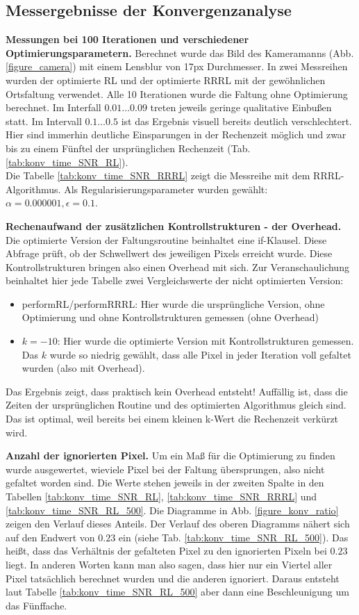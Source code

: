 \documentclass[a4paper,12pt]{article}
\begin{document}
 
\subsection{Messergebnisse der Konvergenzanalyse}

\textbf{Messungen bei 100 Iterationen und verschiedener Optimierungsparametern.}
Berechnet wurde das Bild des Kameramanns (Abb. \ref{figure_camera}) mit einem Lensblur von 17px Durchmesser. In zwei Messreihen wurden der optimierte
RL und der optimierte RRRL mit der gewöhnlichen Ortsfaltung verwendet. 
Alle 10 Iterationen wurde die Faltung ohne Optimierung berechnet.
Im Interfall $0.01\ldots0.09$ treten jeweils geringe qualitative Einbußen statt.
Im Intervall $0.1\ldots0.5$ ist das Ergebnis visuell bereits deutlich
verschlechtert. Hier sind immerhin deutliche Einsparungen in der Rechenzeit
möglich und zwar bis zu einem Fünftel der ursprünglichen Rechenzeit
(Tab. \ref{tab:konv_time_SNR_RL}).
\\
Die Tabelle \ref{tab:konv_time_SNR_RRRL} zeigt die Messreihe mit dem
RRRL-Algorithmus. Als Regularisierungs\-parameter wurden gewählt: 
$\alpha = 0.000001, \epsilon = 0.1$.

\textbf{Rechenaufwand der zusätzlichen Kontrollstrukturen - der Overhead.}
Die optimierte Version der Faltungsroutine beinhaltet eine if-Klausel. Diese
Abfrage prüft, ob der Schwellwert des jeweiligen Pixels erreicht wurde. 
Diese Kontrollstrukturen bringen also einen Overhead mit sich. Zur
Veranschaulichung beinhaltet hier jede Tabelle zwei Vergleichswerte der
nicht optimierten Version:
\begin{itemize}
  \itemsep -1pt
  \item performRL/performRRRL: Hier wurde die ursprüngliche Version, ohne
  Optimierung und ohne Kontrollstrukturen gemessen (ohne Overhead)
  \item $k=-10$: Hier wurde die optimierte Version mit Kontrollstrukturen
  gemessen. Das $k$ wurde so niedrig gewählt, dass alle Pixel in jeder Iteration
  voll gefaltet wurden (also mit Overhead).
\end{itemize}
Das Ergebnis zeigt, dass praktisch kein Overhead entsteht! Auffällig ist, dass
die Zeiten der ursprünglichen Routine und des optimierten Algorithmus gleich
sind. Das ist optimal, weil bereits bei einem kleinen k-Wert die Rechenzeit
verkürzt wird.

\textbf{Anzahl der ignorierten Pixel.} Um ein Maß für die Optimierung zu finden
wurde ausgewertet, wieviele Pixel bei der Faltung übersprungen, also nicht
gefaltet worden sind. Die Werte stehen jeweils in der zweiten Spalte in den
Tabellen \ref{tab:konv_time_SNR_RL}, \ref{tab:konv_time_SNR_RRRL} und
\ref{tab:konv_time_SNR_RL_500}. Die Diagramme in Abb. \ref{figure_konv_ratio}
zeigen den Verlauf dieses Anteils. Der Verlauf des oberen Diagramms nähert sich
auf den Endwert von $0.23$ ein (siehe Tab. \ref{tab:konv_time_SNR_RL_500}). Das
heißt, dass das Verhältnis der gefalteten Pixel zu den ignorierten Pixeln bei
$0.23$ liegt. In anderen Worten kann man also sagen, dass hier nur ein
Viertel aller Pixel tatsächlich berechnet wurden und die anderen ignoriert. Daraus
entsteht laut Tabelle \ref{tab:konv_time_SNR_RL_500} aber dann eine
Beschleunigung um das Fünffache.
\end{document}
